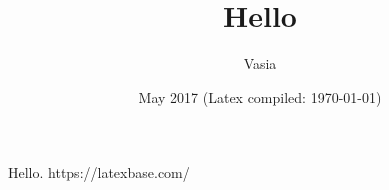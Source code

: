 \documentclass[10pt,a4paper,twocolumn]{article}
\title{Hello}
\date{May 2017 (Latex compiled: \today)}
\author{Vasia}
\begin{document}
\maketitle


Hello.
https://latexbase.com/
\end{document}
